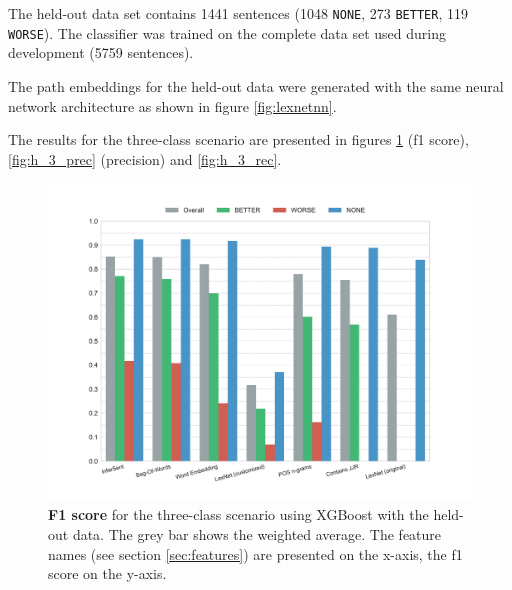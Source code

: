 The held-out data set contains 1441 sentences (1048 \texttt{NONE}, 273 \texttt{BETTER}, 119 \texttt{WORSE}). The classifier was trained on the complete data set used during development (5759 sentences).

The path embeddings for the held-out data were generated with the same neural network architecture as shown in figure \ref{fig:lexnetnn}.

The results for the three-class scenario are presented in figures \ref{fig:h_3_f1} (f1 score), \ref{fig:h_3_prec} (precision) and \ref{fig:h_3_rec}.


\begin{figure}[htbp]
         \caption{\textbf{F1 score} for the three-class scenario using XGBoost with the held-out data. The grey bar shows the weighted average. The feature names (see section \ref{sec:features}) are presented on the x-axis, the f1 score on the y-axis.} 
    \label{fig:h_3_f1}
    \centering
	\includegraphics[width=1\linewidth]{images/heldout/h-f1-False}
    \end{figure}
    


